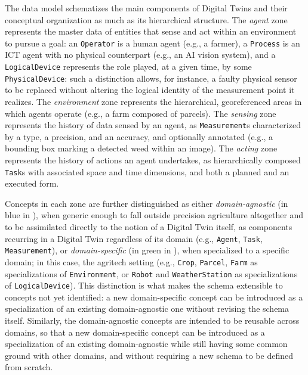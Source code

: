 The data model schematizes the main components of Digital Twins and their conceptual organization as much as its hierarchical structure. The \emph{agent} zone represents the master data of entities that sense and act within an environment to pursue a goal: an \texttt{Operator} is a human agent (e.g., a farmer), a \texttt{Process} is an ICT agent with no physical counterpart (e.g., an AI vision system), and a \texttt{LogicalDevice} represents the role played, at a given time, by some \texttt{PhysicalDevice}: such a distinction allows, for instance, a faulty physical sensor to be replaced without altering the logical identity of the measurement point it realizes. The \emph{environment} zone represents the hierarchical, georeferenced areas in which agents operate (e.g., a farm composed of parcels). The \emph{sensing} zone represents the history of data sensed by an agent, as \texttt{Measurement}s characterized by a type, a precision, and an accuracy, and optionally annotated (e.g., a bounding box marking a detected weed within an image). The \emph{acting} zone represents the history of actions an agent undertakes, as hierarchically composed \texttt{Task}s with associated space and time dimensions, and both a planned and an executed form.

Concepts in each zone are further distinguished as either \emph{domain-agnostic} (in blue in ), when generic enough to fall outside precision agriculture altogether and to be assimilated directly to the notion of a Digital Twin itself, as components recurring in a Digital Twin regardless of its domain (e.g., \texttt{Agent}, \texttt{Task}, \texttt{Measurement}), or \emph{domain-specific} (in green in ), when specialized to a specific domain; in this case, the agritech setting (e.g., \texttt{Crop}, \texttt{Parcel}, \texttt{Farm} as specializations of \texttt{Environment}, or \texttt{Robot} and \texttt{WeatherStation} as specializations of \texttt{LogicalDevice}). This distinction is what makes the schema extensible to concepts not yet identified: a new domain-specific concept can be introduced as a specialization of an existing domain-agnostic one without revising the schema itself.
Similarly, the domain-agnostic concepts are intended to be reusable across domains, so that a new domain-specific concept can be introduced as a specialization of an existing domain-agnostic while still having some common ground with other domains, and without requiring a new schema to be defined from scratch.


